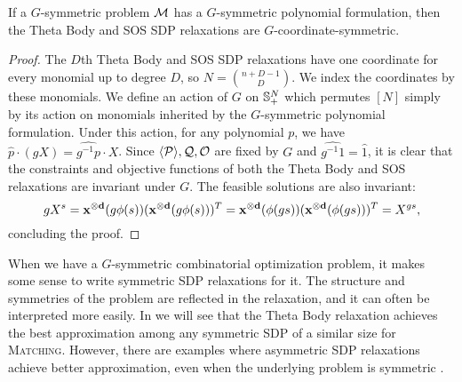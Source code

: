 \begin{lemma}
If a $G$-symmetric problem $\mathcal M$ has a $G$-symmetric polynomial formulation, then the Theta Body and SOS SDP relaxations are $G$-coordinate-symmetric.
\end{lemma}
\begin{proof}
The $D$th Theta Body and SOS SDP relaxations have one coordinate for every monomial up to degree $D$, so $N = \binom{n+D-1}{D}$. We index the coordinates by these monomials. We define an action of $G$ on $\mathbb{S}^{N}_+$ which permutes $[N]$ simply by its action on monomials inherited by the $G$-symmetric polynomial formulation. Under this action, for any polynomial $p$, we have $\hat{p}\cdot (gX) = \widehat{g^{-1}p} \cdot X$. Since $\langle \mathcal P \rangle,\mathcal Q,\mathcal O$ are fixed by $G$ and $\widehat{g^{-1}1} = \hat{1}$, it is clear that the constraints and objective functions of both the Theta Body and SOS relaxations are invariant under $G$. The feasible solutions are also invariant:
\[gX^s = \mathbf{x^{\otimes d}}(g\phi(s))(\mathbf{x^{\otimes d}}(g\phi(s)))^T = \mathbf{x^{\otimes d}}(\phi(gs))(\mathbf{x^{\otimes d}}(\phi(gs)))^T = X^{gs},\]
concluding the proof.
\end{proof}

When we have a $G$-symmetric combinatorial optimization problem, it makes some sense to write symmetric SDP relaxations for it.
The structure and symmetries of the problem are reflected in the relaxation, and it can often be interpreted more easily. 
In  we will see that the Theta Body relaxation achieves the best approximation among any symmetric SDP of a similar size for \textsc{Matching}.
However, there are examples where asymmetric SDP relaxations achieve better approximation, even when the underlying problem is symmetric \cite{}. 